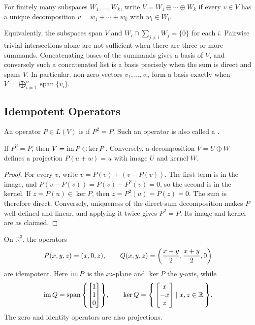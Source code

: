 \begin{Definition}
For finitely many subspaces $W_1,\ldots,W_k$, write $V=W_1\oplus\cdots\oplus W_k$ if every $v\in V$ has a unique decomposition $v=w_1+\cdots+w_k$ with $w_i\in W_i$.
\end{Definition}

Equivalently, the subspaces span $V$ and $W_i\cap\sum_{j\ne i}W_j=\{0\}$ for each $i$. Pairwise trivial intersections alone are not sufficient when there are three or more summands. Concatenating bases of the summands gives a basis of $V$, and conversely such a concatenated list is a basis precisely when the sum is direct and spans $V$. In particular, non-zero vectors $v_1,\ldots,v_n$ form a basis exactly when $V=\bigoplus_{i=1}^n\operatorname{span}\{v_i\}$.

\subsection{Idempotent Operators}

\begin{Definition}
An operator $P\in L(V)$ is  if $P^2=P$. Such an operator is also called a .
\end{Definition}

\begin{Theorem}\label{thm:ProjectionSplit}
If $P^2=P$, then $V=\operatorname{im} P\oplus\ker P$. Conversely, a decomposition $V=U\oplus W$ defines a projection $P(u+w)=u$ with image $U$ and kernel $W$.
\end{Theorem}
\begin{proof}
For every $v$, write $v=P(v)+(v-P(v))$. The first term is in the image, and $P(v-P(v))=P(v)-P^2(v)=0$, so the second is in the kernel. If $z=P(u)\in\ker P$, then $z=P^2(u)=P(z)=0$. The sum is therefore direct. Conversely, uniqueness of the direct-sum decomposition makes $P$ well defined and linear, and applying it twice gives $P^2=P$. Its image and kernel are as claimed.
\end{proof}

\begin{Example}
On $\mathbb R^3$, the operators
\begin{equation*}
P(x,y,z)=(x,0,z),\qquad Q(x,y,z)=\pqty{\frac{x+y}{2},\frac{x+y}{2},0}
\end{equation*}
are idempotent. Here $\operatorname{im} P$ is the $xz$-plane and $\ker P$ the $y$-axis, while
\begin{equation*}
\operatorname{im} Q=\operatorname{span}\qty{\begin{bmatrix}1\\1\\0\end{bmatrix}},\qquad \ker Q=\qty{\, \begin{bmatrix}x\\-x\\z\end{bmatrix} \mid x,z\in\mathbb R \,}.
\end{equation*}
The zero and identity operators are also projections.
\end{Example}

